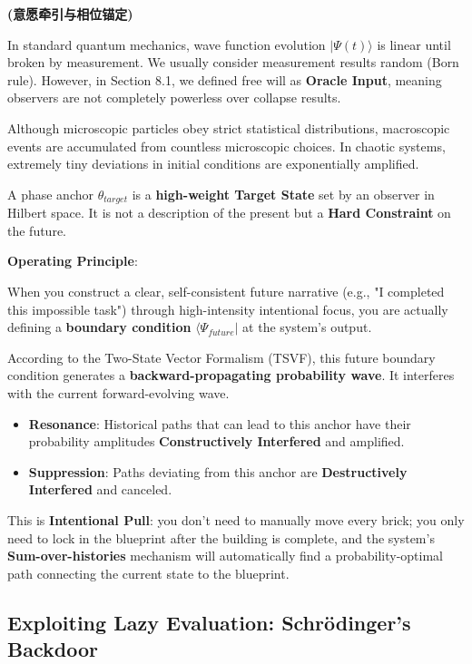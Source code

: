 \textbf{(意愿牵引与相位锚定)}

In standard quantum mechanics, wave function evolution $|\Psi(t)\rangle$ is linear until broken by measurement. We usually consider measurement results random (Born rule). However, in Section 8.1, we defined free will as \textbf{Oracle Input}, meaning observers are not completely powerless over collapse results.

Although microscopic particles obey strict statistical distributions, macroscopic events are accumulated from countless microscopic choices. In chaotic systems, extremely tiny deviations in initial conditions are exponentially amplified.

\begin{definition}
A phase anchor $\theta_{target}$ is a \textbf{high-weight Target State} set by an observer in Hilbert space. It is not a description of the present but a \textbf{Hard Constraint} on the future.
\end{definition}

\textbf{Operating Principle}:

When you construct a clear, self-consistent future narrative (e.g., "I completed this impossible task") through high-intensity intentional focus, you are actually defining a \textbf{boundary condition} $\langle \Psi_{future}|$ at the system's output.

According to the Two-State Vector Formalism (TSVF), this future boundary condition generates a \textbf{backward-propagating probability wave}. It interferes with the current forward-evolving wave.

\begin{itemize}
\item \textbf{Resonance}: Historical paths that can lead to this anchor have their probability amplitudes \textbf{Constructively Interfered} and amplified.

\item \textbf{Suppression}: Paths deviating from this anchor are \textbf{Destructively Interfered} and canceled.
\end{itemize}

This is \textbf{Intentional Pull}: you don't need to manually move every brick; you only need to lock in the blueprint after the building is complete, and the system's \textbf{Sum-over-histories} mechanism will automatically find a probability-optimal path connecting the current state to the blueprint.

\subsection{Exploiting Lazy Evaluation: Schrödinger's Backdoor}

